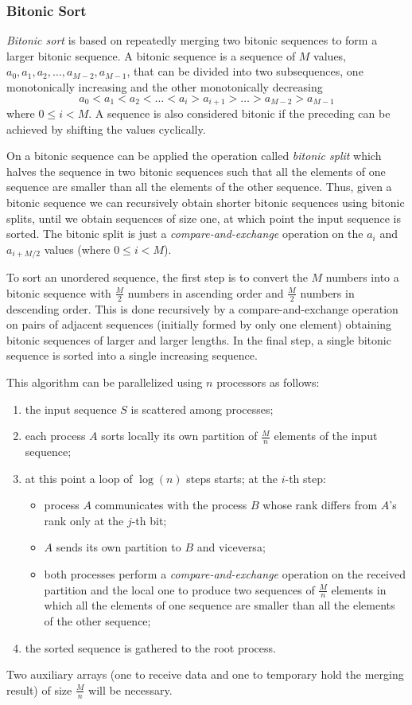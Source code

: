 \subsubsection{Bitonic Sort}
\textit{Bitonic sort} is based on repeatedly merging two bitonic sequences to form a larger bitonic sequence. A bitonic sequence is a sequence of $M$ values, $a_0, a_1, a_2, \dots, a_{M-2}, a_{M-1}$, that can be divided into two subsequences, one monotonically increasing and the other monotonically decreasing
\[
a_0 < a_1 < a_2 < \dots < a_i > a_{i+1} > \dots > a_{M-2} > a_{M-1}
\]
where $0 \leq i < M$.
A sequence is also considered bitonic if the preceding can be achieved by shifting the values cyclically.

On a bitonic sequence can be applied the operation called \textit{bitonic split} which halves the sequence in two bitonic sequences such that all the elements of one sequence are smaller than all the elements of the other sequence. Thus, given a bitonic sequence we can recursively obtain shorter bitonic sequences using bitonic splits, until we obtain sequences of size one, at which point the input sequence is sorted. The bitonic split is just a \textit{compare-and-exchange} operation on the $a_i$ and $a_{i+M/2}$ values (where $0 \le i < M$).

To sort an unordered sequence, the first step is to convert the $M$ numbers into a bitonic sequence with $\frac{M}{2}$ numbers in ascending order and $\frac{M}{2}$ numbers in descending order. This is done recursively by a compare-and-exchange operation on pairs of adjacent sequences (initially formed by only one element) obtaining bitonic sequences of larger and larger lengths. In the final step, a single bitonic sequence is sorted into a single increasing sequence.

This algorithm can be parallelized using $n$ processors as follows:
\begin{enumerate}
	\item the input sequence $S$ is scattered among processes;
	\item each process $A$ sorts locally its own partition of $\frac{M}{n}$ elements of the input sequence;
	\item at this point a loop of $\log(n)$ steps starts; at the $i$-th step:
		\begin{itemize}
			\item process $A$ communicates with the process $B$ whose rank differs from $A$'s rank only at the $j$-th bit;
			\item $A$ sends its own partition to $B$ and viceversa;			
			\item both processes perform a \textit{compare-and-exchange} operation on the received partition and the local one to produce two sequences of $\frac{M}{n}$ elements in which all the elements of one sequence are smaller than all the elements of the other sequence;			
		\end{itemize}
	\item the sorted sequence is gathered to the root process.
\end{enumerate}
Two auxiliary arrays (one to receive data and one to temporary hold the merging result) of size $\frac{M}{n}$ will be necessary.


